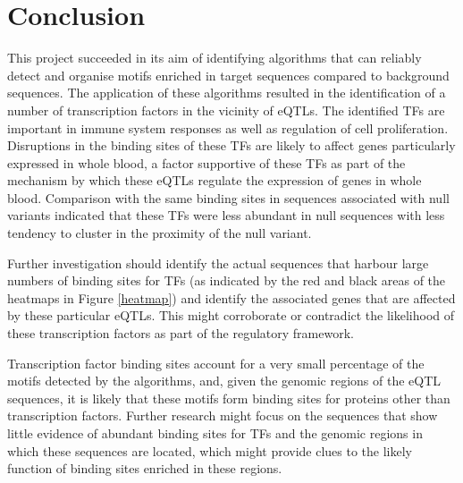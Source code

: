 \documentclass[12pt]{article}
\begin{document}
\section{Conclusion}

This project succeeded in its aim of identifying algorithms that can reliably detect and organise motifs enriched in target sequences compared to background sequences. The application of these algorithms resulted in the identification of a number of transcription factors in the vicinity of eQTLs. The identified TFs are important in immune system responses as well as regulation of cell proliferation. Disruptions in the binding sites of these TFs are likely to affect genes particularly expressed in whole blood, a factor supportive of these TFs as part of the mechanism by which these eQTLs regulate the expression of genes in whole blood. Comparison with the same binding sites in sequences associated with null variants indicated that these TFs were less abundant in null sequences with less tendency to cluster in the proximity of the null variant. 

Further investigation should identify the actual sequences that harbour large numbers of binding sites for TFs (as indicated by the red and black areas of the heatmaps in Figure \ref{heatmap}) and identify the associated genes that are affected by these particular eQTLs. This might corroborate or contradict the likelihood of these transcription factors as part of the regulatory framework.

Transcription factor binding sites account for a very small percentage of the motifs detected by the algorithms, and, given the genomic regions of the eQTL sequences, it is likely that these motifs form binding sites for proteins other than transcription factors. Further research might focus on the sequences that show little evidence of abundant binding sites for TFs and the genomic regions in which these sequences are located, which might provide clues to the likely function of binding sites enriched in these regions. 


\clearpage


\end{document}
